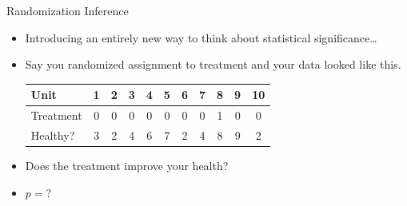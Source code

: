 \documentclass[
  11pt,
  ignorenonframetext,
]{beamer}
\begin{document}
\begin{frame}{Randomization Inference}
\protect\hypertarget{randomization-inference-1}{}
\begin{itemize}
    \item  Introducing an entirely new way to think about statistical significance\dots
    \item  Say you randomized assignment to treatment and your data looked like this.
\begin{table}
    \centering
        \begin{tabular}{l|cccccccccc}
        Unit            & 1&2&3&4&5&6&7&8&9&10\\ \hline
        Treatment & 0&0&0&0&0&0&0&1&0&0\\
        Healthy?    & 3&2&4&6&7&2&4&8&9&2\\ \hline          
        \end{tabular}
\end{table}
    \item Does the treatment improve your health?
    \item $p=$?
\end{itemize}
\end{frame}
\end{document}
